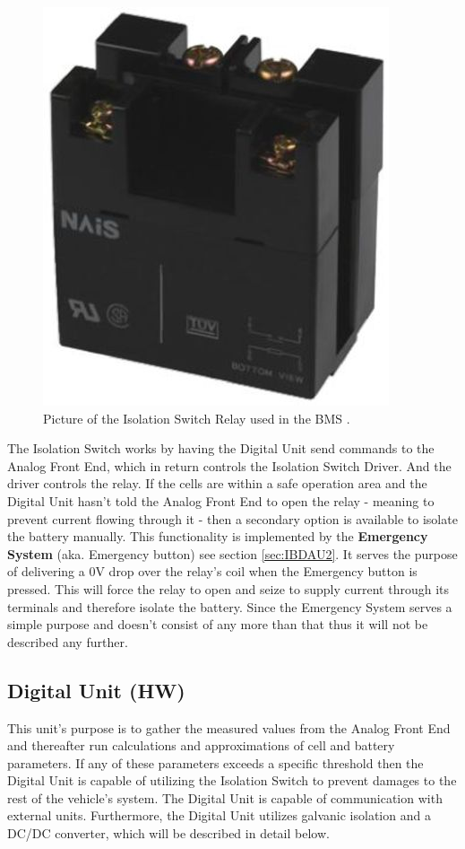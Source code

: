 \begin{figure}[H]
	\centering
	\includegraphics[width=0.3\linewidth]{Hardware/Pictures/BMSRelay}
	\caption[Empty]{Picture of the Isolation Switch Relay used in the BMS \cite{IsolationSwitchOnline}.}
	\label{fig:BMSRelay}
\end{figure}

The Isolation Switch works by having the Digital Unit send commands to the Analog Front End, which in return controls the Isolation Switch Driver. And the driver controls the relay. If the cells are within a safe operation area and the Digital Unit hasn't told the Analog Front End to open the relay - meaning to prevent current flowing through it - then a secondary option is available to isolate the battery manually. This functionality is implemented by the \textbf{Emergency System} (aka. Emergency button) see section \vref{sec:IBDAU2}. It serves the purpose of delivering a 0V drop over the relay's coil when the Emergency button is pressed. This will force the relay to open and seize to supply current through its terminals and therefore isolate the battery. Since the Emergency System serves a simple purpose and doesn't consist of any more than that thus it will not be described any further.

\subsection{Digital Unit (HW)}
This unit's purpose is to gather the measured values from the Analog Front End and thereafter run calculations and approximations of cell and battery parameters. If any of these parameters exceeds a specific threshold then the Digital Unit is capable of utilizing the Isolation Switch to prevent damages to the rest of the vehicle's system. The Digital Unit is capable of communication with external units. Furthermore, the Digital Unit utilizes galvanic isolation and a DC/DC converter, which will be described in detail below. 

